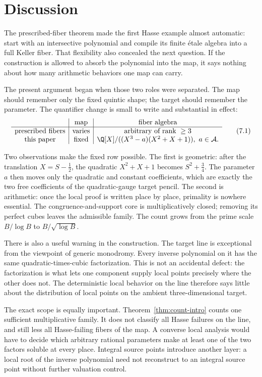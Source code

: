 \section{Discussion}

The prescribed-fiber theorem made the first Hasse example almost automatic:
start with an intersective polynomial and compile its finite \'etale algebra
into a full Keller fiber.  That flexibility also concealed the next
question.  If the construction is allowed to absorb the polynomial into the
map, it says nothing about how many arithmetic behaviors one map can carry.

The present argument began when those two roles were separated.  The map
should remember only the fixed quintic shape; the target should remember the
parameter.  The quantifier change is small to write and substantial in
effect:
\[
\begin{array}{c|c|c}
 &\text{map}&\text{fiber algebra}\\ \hline
\text{prescribed fibers}&\text{varies}&\text{arbitrary of rank }\ge3\\
\text{this paper}&\text{fixed}&
 \Q[X]/((X^3-a)(X^2+X+1)),\ a\in\mathcal A.
\end{array}
\tag{7.1}
\]

Two observations make the fixed row possible.  The first is geometric:
after the translation \(X=S-\tfrac12\), the quadratic
\(X^2+X+1\) becomes \(S^2+\tfrac34\).  The parameter \(a\) then moves
only the quadratic and constant coefficients, which are exactly the two
free coefficients of the quadratic-gauge target pencil.  The second is
arithmetic: once the local proof is written place by place, primality is
nowhere essential.  The congruence-and-support core is multiplicatively
closed; removing its perfect cubes leaves the admissible family.  The
count grows from the prime scale \(B/\log B\) to
\(B/\sqrt{\log B}\).

There is also a useful warning in the construction.  The target line is
exceptional from the viewpoint of generic monodromy.  Every inverse
polynomial on it has the same quadratic-times-cubic factorization.  This is
not an accidental defect: the factorization is what lets one component
supply local points precisely where the other does not.  The deterministic
local behavior on the line therefore says little about the distribution of
local points on the ambient three-dimensional target.

The exact scope is equally important.  Theorem~\ref{thm:count-intro} counts
one sufficient multiplicative family.  It does not classify all Hasse
failures on the line, and still less all Hasse-failing fibers of the map.
A converse local analysis would have to decide which arbitrary rational
parameters make at least one of the two factors soluble at every place.
Integral source points introduce another layer: a local root of the inverse
polynomial need not reconstruct to an integral source point without further
valuation control.

